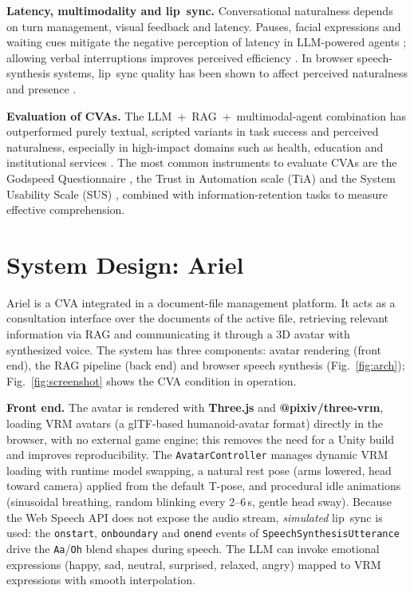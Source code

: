 \documentclass[conference]{IEEEtran}
\begin{document}
\textbf{Latency, multimodality and lip~sync.}
Conversational naturalness depends on turn management, visual feedback and
latency. Pauses, facial expressions and waiting cues mitigate the negative
perception of latency in LLM-powered agents \cite{jolibois2025,elfleet2024};
allowing verbal interruptions improves perceived efficiency \cite{egelhofer2025}.
In browser speech-synthesis systems, lip~sync quality has been shown to affect
perceived naturalness and presence \cite{chang2022,elfleet2024}.

\textbf{Evaluation of CVAs.}
The LLM~+~RAG~+~multimodal-agent combination has outperformed purely textual,
scripted variants in task success and perceived naturalness, especially in
high-impact domains such as health, education and institutional services
\cite{yang2025health}. The most common instruments to evaluate CVAs are the
Godspeed Questionnaire \cite{bartneck2009}, the Trust in Automation scale (TiA)
\cite{jian2000} and the System Usability Scale (SUS) \cite{brooke1996},
combined with information-retention tasks to measure effective comprehension.


\section{System Design: Ariel}
\label{sec:system}

Ariel is a CVA integrated in a document-file management platform.
It acts as a consultation interface over the documents of the active file,
retrieving relevant information via RAG and communicating it through a 3D avatar
with synthesized voice. The system has three components: avatar rendering
(front end), the RAG pipeline (back end) and browser speech synthesis
(Fig.~\ref{fig:arch}); Fig.~\ref{fig:screenshot} shows the CVA condition in
operation.

\textbf{Front end.}
The avatar is rendered with \textbf{Three.js} and \textbf{@pixiv/three-vrm},
loading VRM avatars (a glTF-based humanoid-avatar format) directly in the
browser, with no external game engine; this removes the need for a Unity build
and improves reproducibility. The
\texttt{AvatarController} manages dynamic VRM loading with runtime model
swapping, a natural rest pose (arms lowered, head toward camera) applied from
the default T-pose, and procedural idle animations (sinusoidal breathing,
random blinking every 2--6\,s, gentle head sway). Because the Web Speech API does
not expose the audio stream, \emph{simulated} lip~sync is used: the
\texttt{onstart}, \texttt{onboundary} and \texttt{onend} events of
\texttt{SpeechSynthesisUtterance} drive the \texttt{Aa}/\texttt{Oh} blend shapes
during speech. The LLM can invoke emotional expressions (happy, sad, neutral,
surprised, relaxed, angry) mapped to VRM expressions with smooth interpolation.
\end{document}
